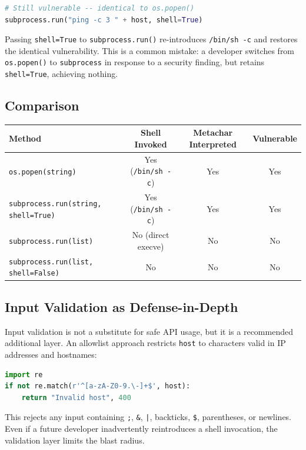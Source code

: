 \begin{lstlisting}[language=Python]
# Still vulnerable -- identical to os.popen()
subprocess.run("ping -c 3 " + host, shell=True)
\end{lstlisting}

Passing \texttt{shell=True} to \texttt{subprocess.run()} re-introduces \texttt{/bin/sh -c} and restores the identical vulnerability. This is a common mistake: a developer switches from \texttt{os.popen()} to \texttt{subprocess} in response to a security finding, but retains \texttt{shell=True}, achieving nothing.

\subsection{Comparison}

\begin{center}
\begin{tabular}{|l|c|c|c|}
\hline
\textbf{Method} & \textbf{Shell Invoked} & \textbf{Metachar Interpreted} & \textbf{Vulnerable} \\
\hline
\texttt{os.popen(string)} & Yes (\texttt{/bin/sh -c}) & Yes & Yes \\
\texttt{subprocess.run(string, shell=True)} & Yes (\texttt{/bin/sh -c}) & Yes & Yes \\
\texttt{subprocess.run(list)} & No (direct execve) & No & No \\
\texttt{subprocess.run(list, shell=False)} & No & No & No \\
\hline
\end{tabular}
\end{center}

\subsection{Input Validation as Defense-in-Depth}

Input validation is not a substitute for safe API usage, but it is a recommended additional layer. An allowlist approach restricts \texttt{host} to characters valid in IP addresses and hostnames:

\begin{lstlisting}[language=Python]
import re
if not re.match(r'^[a-zA-Z0-9.\-]+$', host):
    return "Invalid host", 400
\end{lstlisting}

This rejects any input containing \texttt{;}, \texttt{\&}, \texttt{|}, backticks, \texttt{\$}, parentheses, or newlines. Even if a future developer inadvertently reintroduces a shell invocation, the validation layer limits the blast radius.

